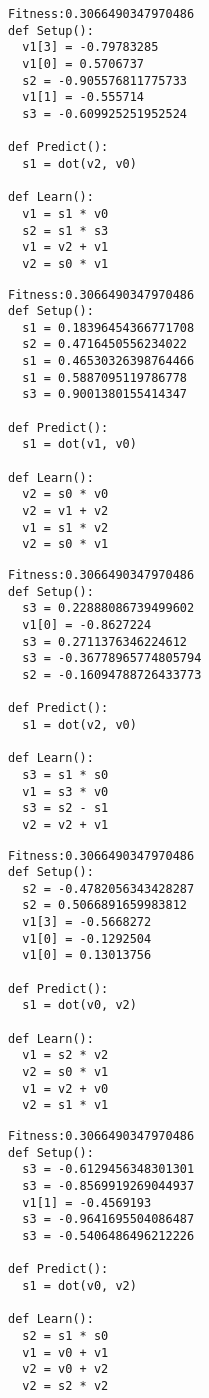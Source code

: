 \documentclass[twocolumn, a4j]{jarticle}
\begin{document}
\begin{lstlisting}[caption= No. 0.16]
Fitness:0.3066490347970486 
def Setup():
  v1[3] = -0.79783285
  v1[0] = 0.5706737
  s2 = -0.905576811775733
  v1[1] = -0.555714
  s3 = -0.609925251952524

def Predict():
  s1 = dot(v2, v0)

def Learn():
  v1 = s1 * v0
  s2 = s1 * s3
  v1 = v2 + v1
  v2 = s0 * v1

\end{lstlisting}

\newpage

\begin{lstlisting}[caption= No. 0.17]
Fitness:0.3066490347970486 
def Setup():
  s1 = 0.18396454366771708
  s2 = 0.4716450556234022
  s1 = 0.46530326398764466
  s1 = 0.5887095119786778
  s3 = 0.9001380155414347

def Predict():
  s1 = dot(v1, v0)

def Learn():
  v2 = s0 * v0
  v2 = v1 + v2
  v1 = s1 * v2
  v2 = s0 * v1

\end{lstlisting}

\begin{lstlisting}[caption= No. 0.18]
Fitness:0.3066490347970486 
def Setup():
  s3 = 0.22888086739499602
  v1[0] = -0.8627224
  s3 = 0.2711376346224612
  s3 = -0.36778965774805794
  s2 = -0.16094788726433773

def Predict():
  s1 = dot(v2, v0)

def Learn():
  s3 = s1 * s0
  v1 = s3 * v0
  s3 = s2 - s1
  v2 = v2 + v1

\end{lstlisting}

\newpage

\begin{lstlisting}[caption= No. 0.19]
Fitness:0.3066490347970486 
def Setup():
  s2 = -0.4782056343428287
  s2 = 0.5066891659983812
  v1[3] = -0.5668272
  v1[0] = -0.1292504
  v1[0] = 0.13013756

def Predict():
  s1 = dot(v0, v2)

def Learn():
  v1 = s2 * v2
  v2 = s0 * v1
  v1 = v2 + v0
  v2 = s1 * v1

\end{lstlisting}

\begin{lstlisting}[caption= No. 0.20]
Fitness:0.3066490347970486 
def Setup():
  s3 = -0.6129456348301301
  s3 = -0.8569919269044937
  v1[1] = -0.4569193
  s3 = -0.9641695504086487
  s3 = -0.5406486496212226

def Predict():
  s1 = dot(v0, v2)

def Learn():
  s2 = s1 * s0
  v1 = v0 + v1
  v2 = v0 + v2
  v2 = s2 * v2

\end{lstlisting}
\end{document}
